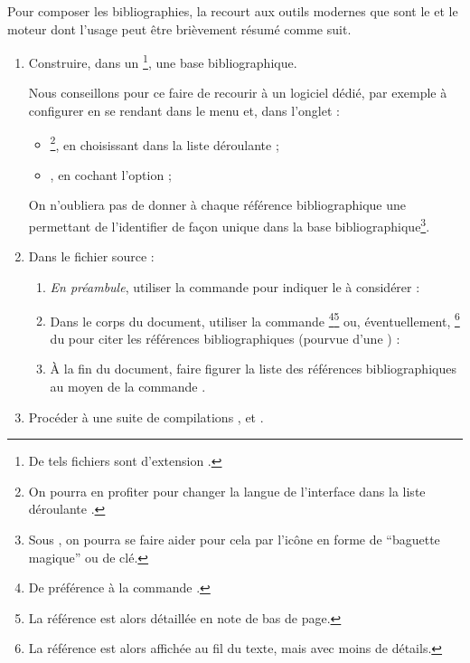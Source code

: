 \documentclass[french,nolocaltoc]{nwejmart}
\newtheorem[title=Fait,style=definition]{fact}
\begin{document}
Pour composer les bibliographies, la \nwejmauthorcl{} recourt aux outils
modernes que sont le  et le moteur  dont
l'usage peut être brièvement résumé comme suit\autocite[Pour plus de détails,
cf. par exemple][en français]{Bitouze}.
\begin{enumerate}
\item Construire, dans un \footnote{De tels
    fichiers sont d'extension .}, une base bibliographique.

  Nous conseillons pour ce faire de recourir à un logiciel dédié, par exemple
  \href{http://jabref.sourceforge.net/}{} à configurer en se
  rendant dans le menu  et, dans l'onglet :
  \begin{itemize}
  \item {}\footnote{On pourra en profiter pour changer la langue de
      l'interface dans la liste déroulante .}, en choisissant
     dans la liste déroulante  ;
  \item {}, en cochant l'option  ;
  \end{itemize}

  On n'oubliera pas de donner à chaque référence bibliographique une 
  permettant de l'identifier de façon unique dans la base
  bibliographique\footnote{Sous , on pourra se faire aider pour
    cela par l'icône en forme de \enquote{baguette magique} ou de clé.}.
\item Dans le fichier source  :
  \begin{enumerate}
  \item \emph{En préambule}, utiliser la commande 
    pour indiquer le  à considérer :
\begin{preamblecode}[listing options={alsolanguage={[biblatex]TeX}}]
".bib}
\end{preamblecode}
  \item Dans le corps du document, utiliser la commande
    \footnote{De préférence à la commande
      .}\footnote{La référence est alors détaillée en note
      de bas de page.}  ou, éventuellement, \footnote{La
      référence est alors affichée au fil du texte, mais avec moins de détails.}
    du  pour citer les références bibliographiques (pourvue
    d'une ) :
  \item À la fin du document, faire figurer la liste des références
    bibliographiques au moyen de la commande .
  \end{enumerate}
\item Procéder à une suite de compilations ,  et
  \suitecompilations.
\end{enumerate}
\end{document}
